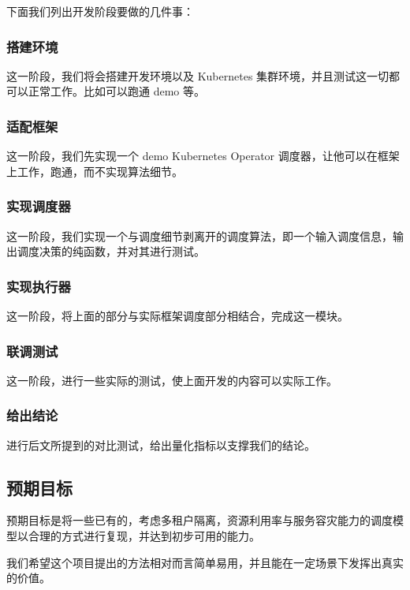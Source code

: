 下面我们列出开发阶段要做的几件事：

\subsubsection{搭建环境}

这一阶段，我们将会搭建开发环境以及 Kubernetes 集群环境，并且测试这一切都可以正常工作。比如可以跑通 demo 等。

\subsubsection{适配框架}

这一阶段，我们先实现一个 demo Kubernetes Operator 调度器，让他可以在框架上工作，跑通，而不实现算法细节。

\subsubsection{实现调度器}

这一阶段，我们实现一个与调度细节剥离开的调度算法，即一个输入调度信息，输出调度决策的纯函数，并对其进行测试。

\subsubsection{实现执行器}

这一阶段，将上面的部分与实际框架调度部分相结合，完成这一模块。

\subsubsection{联调测试}

这一阶段，进行一些实际的测试，使上面开发的内容可以实际工作。

\subsubsection{给出结论}

进行后文所提到的对比测试，给出量化指标以支撑我们的结论。

\subsection{预期目标}

预期目标是将一些已有的，考虑多租户隔离，资源利用率与服务容灾能力的调度模型以合理的方式进行复现，并达到初步可用的能力。

我们希望这个项目提出的方法相对而言简单易用，并且能在一定场景下发挥出真实的价值。

